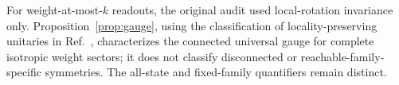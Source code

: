 For weight-at-most-$k$ readouts, the original audit used local-rotation
invariance only. Proposition~\ref{prop:gauge}, using the classification
of locality-preserving unitaries in Ref.~\cite{cpr2019locality},
characterizes the connected universal gauge for complete isotropic
weight sectors; it does not classify disconnected or
reachable-family-specific symmetries. The all-state and fixed-family
quantifiers remain distinct.
